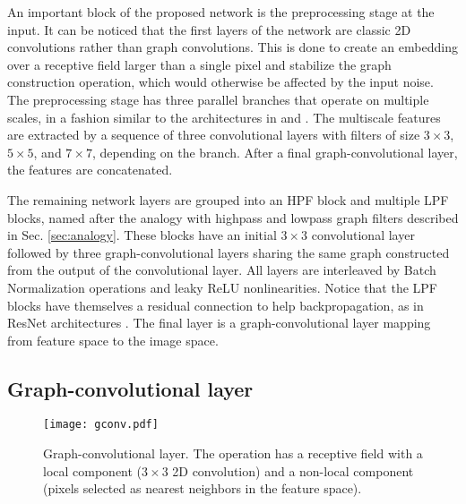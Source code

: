 \documentclass[journal]{IEEEtran}
\begin{document}
An important block of the proposed network is the preprocessing stage at the input. It can be noticed that the first layers of the network are classic 2D convolutions rather than graph convolutions. This is done to create an embedding over a receptive field larger than a single pixel and stabilize the graph construction operation, which would otherwise be affected by the input noise. The preprocessing stage has three parallel branches that operate on multiple scales, in a fashion similar to the architectures in \cite{szegedy2015going} and \cite{divakar2017image}. The multiscale features are extracted by a sequence of three convolutional layers with filters of size $3\times 3$, $5\times 5$, and $7\times 7$, depending on the branch. After a final graph-convolutional layer, the features are concatenated. 

The remaining network layers are grouped into an HPF block and multiple LPF blocks, named after the analogy with highpass and lowpass graph filters described in Sec. \ref{sec:analogy}. These blocks have an initial $3 \times 3$ convolutional layer followed by three graph-convolutional layers sharing the same graph constructed from the output of the convolutional layer. All layers are interleaved by Batch Normalization operations \cite{ioffe2015batchnorm} and leaky ReLU nonlinearities. Notice that the LPF blocks have themselves a residual connection to help backpropagation, as in ResNet architectures \cite{he2016deep}. The final layer is a graph-convolutional layer mapping from feature space to the image space.




\subsection{Graph-convolutional layer} \label{sec:gconv_layer}
\label{sec:graph_conv}
\begin{figure}
    \centering
    \texttt{[image: gconv.pdf]}
    \caption{Graph-convolutional layer. The operation has a receptive field with a local component ($3\times 3$ 2D convolution) and a non-local component (pixels selected as nearest neighbors in the feature space).}
    \label{fig:gconv}
\end{figure}
\end{document}
